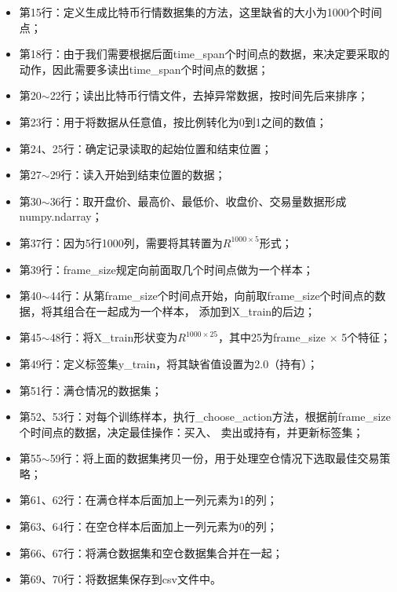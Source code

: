 \documentclass{article}
\begin{document}
\begin{itemize}
\item 第15行：定义生成比特币行情数据集的方法，这里缺省的大小为1000个时间点；
\item 第18行：由于我们需要根据后面time\_span个时间点的数据，来决定要采取的动作，因此需要多读出time\_span个时间点的数据；
\item 第20$\sim$22行；读出比特币行情文件，去掉异常数据，按时间先后来排序；
\item 第23行：用于将数据从任意值，按比例转化为0到1之间的数值；
\item 第24、25行：确定记录读取的起始位置和结束位置；
\item 第27$\sim$29行：读入开始到结束位置的数据；
\item 第30$\sim$36行：取开盘价、最高价、最低价、收盘价、交易量数据形成numpy.ndarray；
\item 第37行：因为5行1000列，需要将其转置为$R^{1000 \times 5}$形式；
\item 第39行：frame\_size规定向前面取几个时间点做为一个样本；
\item 第40$\sim$44行：从第frame\_size个时间点开始，向前取frame\_size个时间点的数据，将其组合在一起成为一个样本，
添加到X\_train的后边；
\item 第45$\sim$48行：将X\_train形状变为$R^{1000 \times 25}$，其中25为frame\_size $\times$ 5个特征；
\item 第49行：定义标签集y\_train，将其缺省值设置为2.0（持有）；
\item 第51行：满仓情况的数据集；
\item 第52、53行：对每个训练样本，执行\_choose\_action方法，根据前frame\_size个时间点的数据，决定最佳操作：买入、
卖出或持有，并更新标签集；
\item 第55$\sim$59行：将上面的数据集拷贝一份，用于处理空仓情况下选取最佳交易策略；
\item 第61、62行：在满仓样本后面加上一列元素为1的列；
\item 第63、64行：在空仓样本后面加上一列元素为0的列；
\item 第66、67行：将满仓数据集和空仓数据集合并在一起；
\item 第69、70行：将数据集保存到csv文件中。
\end{itemize}
\end{document}
